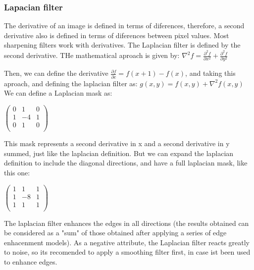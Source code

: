 \documentclass[a4paper]{article}
\begin{document}
\subsubsection{Lapacian filter}
The derivative of an image is defined in terms of diferences, therefore, a second derivative also is defined in terms of diferences between pixel values. Most sharpening filters work with derivatives. The Laplacian filter is defined by the second derivative. THe mathematical aproach is given by:
\begin{math}
\nabla^2 f = \frac{\partial^2 f}{\partial x^2} + \frac{\partial^2 f}{\partial y^2} 
\end{math}

Then, we can define the derivative $\frac{\partial f}{\partial c} = f(x+1) -f(x) $, and taking this aproach, and defining the laplacian filter as:
\begin{math}
g(x,y) = f(x,y) + \nabla^2f(x,y)
\end{math}
\\
We can define a Laplacian mask as: 
\begin{center}
\begin{math}
   \begin{pmatrix} 
   0 & 1 & 0 \\ 
   1 & -4 & 1 \\
   0 & 1 & 0 \\ 
   \end{pmatrix}
\end{math}
\end{center}

This mask represents a second derivative in x and a second derivative in y summed, just like the laplacian definition. But we can expand the laplacian definition to include the diagonal directions, and have a full laplacian mask, like this one: \\
\begin{center}
\begin{math}
   \begin{pmatrix} 
   1 & 1 & 1 \\ 
   1 & -8 & 1 \\
   1 & 1 & 1 \\ 
   \end{pmatrix}
\end{math}\\
\end{center}
The laplacian filter enhances the edges in all directions (the results obtained can be considered as a "sum" of those obtained after applying a series of edge enhacenment models). As a negative attribute, the Laplacian filter reacts greatly to noise, so its recomended to apply a smoothing filter first, in case ist been used to enhance edges.  \\
\end{document}
